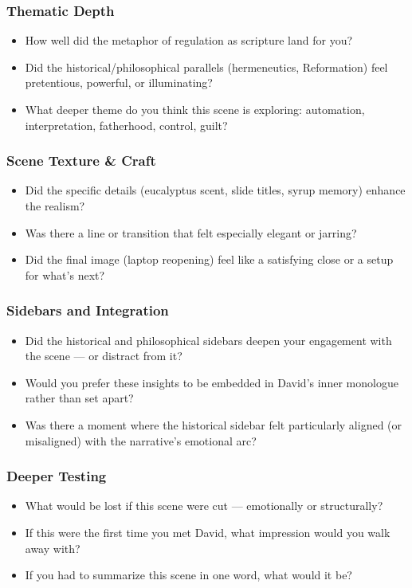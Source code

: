 \subsubsection{Thematic Depth}

\begin{itemize}
  \item How well did the metaphor of regulation as scripture land for you?
  \item Did the historical/philosophical parallels (hermeneutics, Reformation) feel pretentious, powerful, or illuminating?
  \item What deeper theme do you think this scene is exploring: automation, interpretation, fatherhood, control, guilt?
\end{itemize}

\subsubsection{Scene Texture \& Craft}

\begin{itemize}
  \item Did the specific details (eucalyptus scent, slide titles, syrup memory) enhance the realism?
  \item Was there a line or transition that felt especially elegant or jarring?
  \item Did the final image (laptop reopening) feel like a satisfying close or a setup for what’s next?
\end{itemize}

\subsubsection{Sidebars and Integration}

\begin{itemize}
  \item Did the historical and philosophical sidebars deepen your engagement with the scene — or distract from it?
  \item Would you prefer these insights to be embedded in David’s inner monologue rather than set apart?
  \item Was there a moment where the historical sidebar felt particularly aligned (or misaligned) with the narrative’s emotional arc?
\end{itemize}

\subsubsection{Deeper Testing}

\begin{itemize}
  \item What would be lost if this scene were cut — emotionally or structurally?
  \item If this were the first time you met David, what impression would you walk away with?
  \item If you had to summarize this scene in one word, what would it be?
\end{itemize}